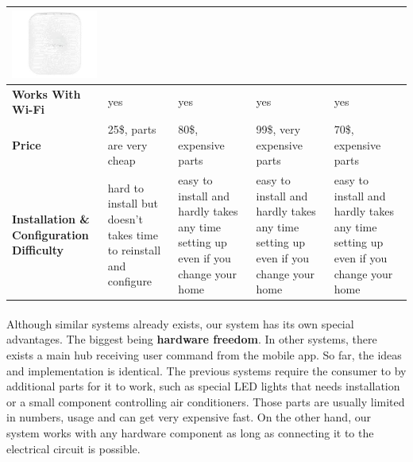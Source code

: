 \documentclass[12pt, oneside, a4paper]{book}
\newcommand\boldcolor[1]{\textcolor{bold}{\textbf{#1}}}
\begin{document}
\begin{table}[H]
\begin{center}
\begin{tabularx}{1\linewidth}{|m{2.2cm}*4{|X}|}
						\includegraphics[width=\linewidth]{img/samsung_hw.png}
					 \\\hline
					\boldcolor{Works With Wi-Fi} & yes & yes & yes & yes  \\\hline

					\boldcolor{Price} & 25\$, parts are very cheap & 80\$, expensive parts & 99\$, very expensive parts & 70\$, expensive parts \\\hline
					
					\boldcolor{Installation \& Configuration Difficulty} & hard to install but doesn't takes time to reinstall and configure& easy to install and hardly takes any time setting up even if you change your home  & easy to install and hardly takes any time setting up even if you change your home  & easy to install and hardly takes any time setting up even if you change your home
					\\\hline
				\end{tabularx}
			\end{center}
		\end{table}
		\newpage
		\paragraph{} Although similar systems already exists, our system has its own special advantages. The biggest being \textbf{hardware freedom}. In other systems, there exists a main hub receiving user command from the mobile app. So far, the ideas and implementation is identical. The previous systems require the consumer to by additional parts for it to work, such as special LED lights that needs installation or a small component controlling air conditioners. Those parts are usually limited in numbers, usage and can get very expensive fast. On the other hand, our system works with any hardware component as long as connecting it to the electrical circuit is possible.
\end{document}

